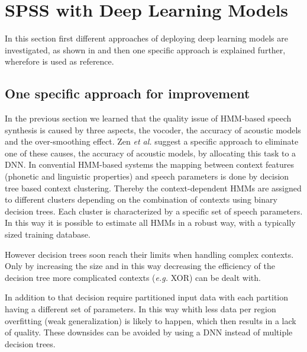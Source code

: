 
\section{\ac{SPSS} with Deep Learning Models}
\label{sec:deepspeech}

{\color{ACMRed}In this section first different approaches of deploying deep learning models are investigated, as shown in \cite{hashimoto:effect} and then one specific approach is explained further, wherefore \cite{zen:deepstatistical} is used as reference.}

\subsection{One specific approach for improvement}
\label{subsec:deepspss}

In the previous section we learned that the quality issue of \ac{HMM}-based speech synthesis is caused by three aspects, the vocoder, the accuracy of acoustic models and the over-smoothing effect. Zen \textit{et al.} \cite{zen:deepstatistical} suggest a specific approach to eliminate one of these causes, the accuracy of acoustic models, by allocating this task to a \ac{DNN}. In convential \ac{HMM}-based systems the mapping between context features (phonetic and linguistic properties) and speech parameters is done by decision tree based context clustering. Thereby the context-dependent \acp{HMM} are assigned to different clusters depending on the combination of contexts using binary decision trees. Each cluster is characterized by a specific set of speech parameters. In this way it is possible to estimate all \acp{HMM} in a robust way, with a typically sized training database.

However decision trees soon reach their limits when handling complex contexts. Only by increasing the size and in this way decreasing the efficiency of the decision tree more complicated contexts (\textit{e.g.} XOR) can be dealt with. 

In addition to that decision require partitioned input data with each partition having a different set of parameters. In this way whith less data per region overfitting (weak generalization) is likely to happen, which then results in a lack of quality. These downsides can be avoided by using a \ac{DNN} instead of multiple decision trees.

